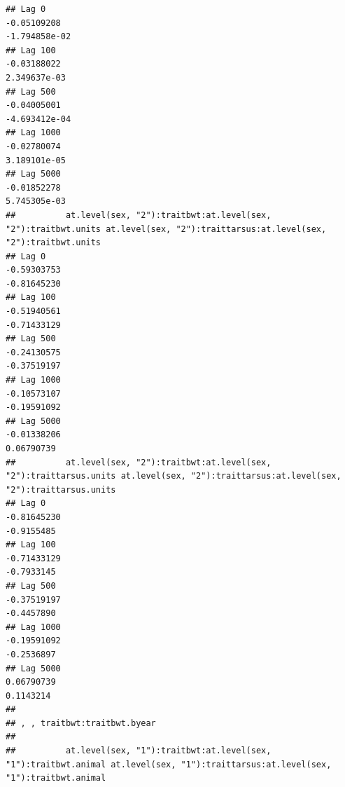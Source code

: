 \documentclass[
  12pt,
]{book}
\begin{document}
\begin{verbatim}
## Lag 0                                                         -0.05109208                                                       -1.794858e-02
## Lag 100                                                       -0.03188022                                                        2.349637e-03
## Lag 500                                                       -0.04005001                                                       -4.693412e-04
## Lag 1000                                                      -0.02780074                                                        3.189101e-05
## Lag 5000                                                      -0.01852278                                                        5.745305e-03
##          at.level(sex, "2"):traitbwt:at.level(sex, "2"):traitbwt.units at.level(sex, "2"):traittarsus:at.level(sex, "2"):traitbwt.units
## Lag 0                                                      -0.59303753                                                      -0.81645230
## Lag 100                                                    -0.51940561                                                      -0.71433129
## Lag 500                                                    -0.24130575                                                      -0.37519197
## Lag 1000                                                   -0.10573107                                                      -0.19591092
## Lag 5000                                                   -0.01338206                                                       0.06790739
##          at.level(sex, "2"):traitbwt:at.level(sex, "2"):traittarsus.units at.level(sex, "2"):traittarsus:at.level(sex, "2"):traittarsus.units
## Lag 0                                                         -0.81645230                                                          -0.9155485
## Lag 100                                                       -0.71433129                                                          -0.7933145
## Lag 500                                                       -0.37519197                                                          -0.4457890
## Lag 1000                                                      -0.19591092                                                          -0.2536897
## Lag 5000                                                       0.06790739                                                           0.1143214
## 
## , , traitbwt:traitbwt.byear
## 
##          at.level(sex, "1"):traitbwt:at.level(sex, "1"):traitbwt.animal at.level(sex, "1"):traittarsus:at.level(sex, "1"):traitbwt.animal

\end{verbatim}
\end{document}
